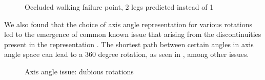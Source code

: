 \begin{figure}[!ht]
    \centering
    \hfil
    \hfil
    \caption{Occluded walking failure point, 2 legs predicted instead of 1}
    \label{fig:humor_bad_occluded_walking}
\end{figure}

We also found that the choice of axis angle representation for various rotations led to the emergence of common known issue that arising from the discontinuities present in the representation \cite{aa_6d_angles}. The shortest path between certain angles in axis angle space can lead to a 360 degree rotation, as seen in , among other issues.

\begin{figure}[!ht]
    \centering
    \hfil
    \hfil
    \caption{Axis angle issue: dubious rotations}
    \label{fig:humor_bad_aa}
\end{figure}

